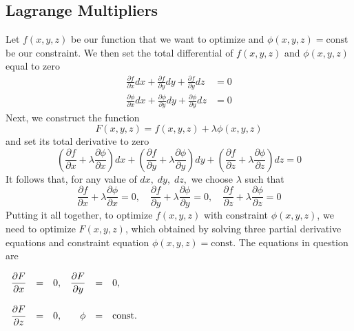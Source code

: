\documentclass[../../../main.tex]{subfiles}
\begin{document}
\subsection{Lagrange Multipliers}
Let $f(x,y,z)$ be our function that we want to optimize and $\phi(x,y,z)=\text{const}$ be our constraint. We then set the total differential of $f(x,y,z)$ and $\phi(x,y,z)$ equal to zero
\begin{align*}
    \frac{\partial f}{\partial x}dx + \frac{\partial f}{\partial y}dy + \frac{\partial f}{\partial y}dz          & =0 \\
    \frac{\partial \phi}{\partial x}dx + \frac{\partial \phi}{\partial y}dy + \frac{\partial \phi}{\partial y}dz & =0
\end{align*}
Next, we construct the function
\begin{equation*}
    F(x,y,z)=f(x,y,z)+\lambda\phi(x,y,z)
\end{equation*}
and set its total derivative to zero
\begin{equation*}
    \left(\frac{\partial f}{\partial x}+ \lambda\frac{\partial \phi}{\partial x}\right)dx + \left(\frac{\partial f}{\partial y}+ \lambda\frac{\partial \phi}{\partial y}\right)dy + \left(\frac{\partial f}{\partial z}+ \lambda\frac{\partial \phi}{\partial z}\right)dz = 0
\end{equation*}
It follows that, for any value of $dx,\;dy,\;dz,$ we choose $\lambda$ such that
\begin{equation*}
    \frac{\partial f}{\partial x}+ \lambda\frac{\partial \phi}{\partial x}=0,\quad \frac{\partial f}{\partial y}+ \lambda\frac{\partial \phi}{\partial y}=0,\quad \frac{\partial f}{\partial z}+ \lambda\frac{\partial \phi}{\partial z}=0
\end{equation*}
Putting it all together, to optimize $f(x,y,z)$ with constraint $\phi(x,y,z)$, we need to optimize $F(x,y,z)$, which obtained by solving three partial derivative equations and constraint equation $\phi(x,y,z)=\text{const}$. The equations in question are
\begin{center}
    $\begin{array}{r c l r c l}
            \displaystyle\frac{\partial F}{\partial x} & = & 0, & \displaystyle\frac{\partial F}{\partial y} & = & 0,            \\
            \\
            \displaystyle\frac{\partial F}{\partial z} & = & 0, & \phi                                       & = & \text{const.}
        \end{array}$
\end{center}
\end{document}

